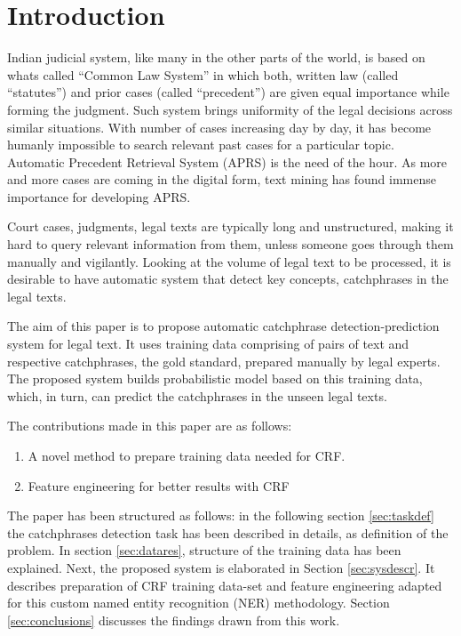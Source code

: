 \section{Introduction}\label{sec:introduction}

Indian judicial system, like many in the other parts of the world, is based on whats called ``Common Law System'' in which both, written law (called ``statutes'') and prior cases (called ``precedent'') are given equal importance while forming the judgment. Such system brings uniformity of the legal decisions across similar situations. With number of cases increasing day by day, it has become humanly impossible to search relevant past cases for a particular topic. Automatic Precedent Retrieval System (APRS) is the need of the hour. As more and more cases are coming in the digital form, text mining has found immense importance for developing APRS.

Court cases, judgments, legal texts are typically long and unstructured, making it hard to query relevant information from them, unless someone goes through them manually and vigilantly. Looking at the volume of legal text to be processed, it is desirable to have automatic system that detect key concepts, catchphrases in the legal texts.

The aim of this paper is to propose automatic catchphrase detection-prediction system for legal text. It uses training data comprising of pairs of text and respective catchphrases,  the gold standard, prepared manually by legal experts. The proposed system builds probabilistic model based on this training data, which, in turn, can predict the catchphrases in the unseen legal texts.

The contributions made in this paper are as follows:

\begin{enumerate}
	\item A novel method to prepare training data needed for CRF.
	\item Feature engineering for better results with CRF
\end{enumerate}

The paper has been structured as follows: in the following section \ref{sec:taskdef} the catchphrases detection task has been described in details, as definition of the problem. In section \ref{sec:datares}, structure of the training data has been explained. Next, the proposed system is elaborated in Section \ref{sec:sysdescr}. It describes preparation of CRF training data-set and feature engineering adapted for this custom named entity recognition (NER) methodology. Section \ref{sec:conclusions} discusses the findings drawn from this work.


